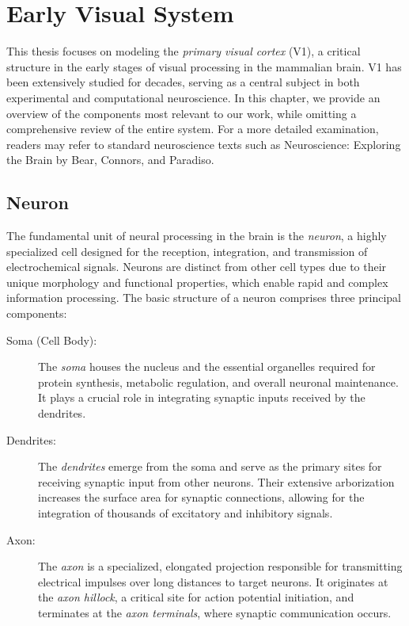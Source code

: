 \chapter{Early Visual System}
\label{chap:visual_system}
This thesis focuses on modeling the \emph{primary visual cortex} (V1), a 
critical structure in the early stages of visual processing in the mammalian 
brain. V1 has been extensively studied for decades, serving as a central subject 
in both experimental and computational neuroscience. In this chapter, we 
provide an overview of the components most relevant to our work, while 
omitting a comprehensive review of the entire system. For a more detailed 
examination, readers may refer to standard neuroscience texts such as 
Neuroscience: Exploring the Brain by Bear, Connors, and Paradiso.

\section{Neuron}
\label{sec:neuron}
The fundamental unit of neural processing in the brain is the \emph{neuron}, a highly 
specialized cell designed for the reception, integration, and transmission of 
electrochemical signals. Neurons are distinct from other cell types due to their 
unique morphology and functional properties, which enable rapid and complex information 
processing. The basic structure of a neuron comprises three principal components:

\begin{description}
    \item[Soma (Cell Body):] The \emph{soma} houses the nucleus and the essential organelles required 
    for protein synthesis, metabolic regulation, and overall neuronal maintenance. It plays
    a crucial role in integrating synaptic inputs received by the dendrites.

    \item[Dendrites:] The \emph{dendrites} emerge from 
    the soma and serve as the primary sites for receiving synaptic input from other neurons.
    Their extensive arborization increases the surface area for synaptic connections, allowing 
    for the integration of thousands of excitatory and inhibitory signals.

    \item[Axon:] The \emph{axon} is a specialized, elongated projection responsible for transmitting 
    electrical impulses over long distances to target neurons. It originates at the \emph{axon hillock},
    a critical site for action potential initiation, and terminates at the 
    \emph{axon terminals}, where synaptic communication occurs.
\end{description}

